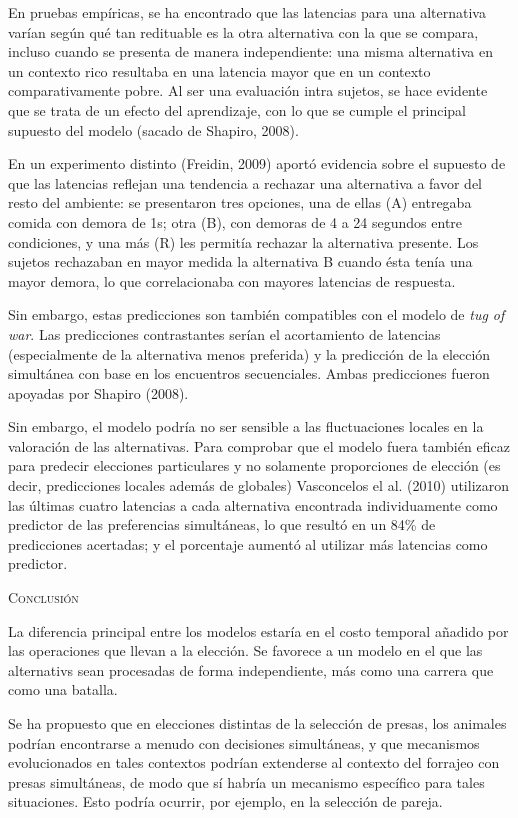 \documentclass[a4paper,12pt]{article}
\begin{document}
En pruebas empíricas, se ha encontrado que las latencias para una alternativa varían según qué tan redituable es la otra alternativa con la que se compara, incluso cuando se presenta de manera independiente: una misma alternativa en un contexto rico resultaba en una latencia mayor que en un contexto comparativamente pobre. Al ser una evaluación intra sujetos, se hace evidente que se trata de un efecto del aprendizaje, con lo que se cumple el principal supuesto del modelo (sacado de Shapiro, 2008).

En un experimento distinto (Freidin, 2009) aportó evidencia sobre el supuesto de que las latencias reflejan una tendencia a rechazar una alternativa a favor del resto del ambiente: se presentaron tres opciones, una de ellas (A) entregaba comida con demora de 1s; otra (B), con demoras de 4 a 24 segundos entre condiciones, y una más (R) les permitía rechazar la alternativa presente. Los sujetos rechazaban en mayor medida la alternativa B cuando ésta tenía una mayor demora, lo que correlacionaba con mayores latencias de respuesta.

Sin embargo, estas predicciones son también compatibles con el modelo de {\slshape tug of war}. Las predicciones contrastantes serían el acortamiento de latencias (especialmente de la alternativa menos preferida) y la predicción de la elección simultánea con base en los encuentros secuenciales. Ambas predicciones fueron apoyadas por Shapiro (2008). 

Sin embargo, el modelo podría no ser sensible a las fluctuaciones locales en la valoración de las alternativas. Para comprobar que el modelo fuera también eficaz para predecir elecciones particulares y no solamente proporciones de elección (es decir, predicciones locales además de globales) Vasconcelos el al. (2010) utilizaron las últimas cuatro latencias a cada alternativa encontrada individuamente como predictor de las preferencias simultáneas, lo que resultó en un 84\% de predicciones acertadas; y el porcentaje aumentó al utilizar más latencias como predictor.

{\scshape Conclusión}

La diferencia principal entre los modelos estaría en el costo temporal añadido por las operaciones que llevan a la elección. Se favorece a un modelo en el que las alternativs sean procesadas de forma independiente, más como una carrera que como una batalla.

Se ha propuesto que en elecciones distintas de la selección de presas, los animales podrían encontrarse a menudo con decisiones simultáneas, y que mecanismos evolucionados en tales contextos podrían extenderse al contexto del forrajeo con presas simultáneas, de modo que sí habría un mecanismo específico para tales situaciones. Esto podría ocurrir, por ejemplo, en la selección de pareja.
\end{document}
